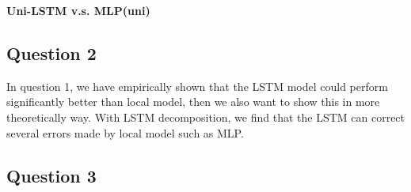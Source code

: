 \documentclass{article}
\begin{document}
\begin{itemize}
\noindent \textbf{Uni-LSTM v.s. MLP(uni)}





\subsection{Question 2}

In question 1, we have empirically shown that the LSTM model could perform significantly better than local model, then we also want to show this in more theoretically way. With LSTM decomposition, we find that the LSTM can correct several errors made by local model such as MLP. 





\subsection{Question 3}


\end{itemize}
\end{document}
